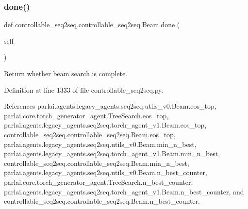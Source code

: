 \mbox{\label{classcontrollable__seq2seq_1_1controllable__seq2seq_1_1Beam_af40dafdaad342152b89d8c4f517c8d8b}} 
\subsubsection{\texorpdfstring{done()}{done()}}
{\footnotesize\ttfamily def controllable\+\_\+seq2seq.\+controllable\+\_\+seq2seq.\+Beam.\+done (\begin{DoxyParamCaption}\item[{}]{self }\end{DoxyParamCaption})}

\begin{DoxyVerb}Return whether beam search is complete.\end{DoxyVerb}
 

Definition at line 1333 of file controllable\+\_\+seq2seq.\+py.



References parlai.\+agents.\+legacy\+\_\+agents.\+seq2seq.\+utils\+\_\+v0.\+Beam.\+eos\+\_\+top, parlai.\+core.\+torch\+\_\+generator\+\_\+agent.\+Tree\+Search.\+eos\+\_\+top, parlai.\+agents.\+legacy\+\_\+agents.\+seq2seq.\+torch\+\_\+agent\+\_\+v1.\+Beam.\+eos\+\_\+top, controllable\+\_\+seq2seq.\+controllable\+\_\+seq2seq.\+Beam.\+eos\+\_\+top, parlai.\+agents.\+legacy\+\_\+agents.\+seq2seq.\+utils\+\_\+v0.\+Beam.\+min\+\_\+n\+\_\+best, parlai.\+agents.\+legacy\+\_\+agents.\+seq2seq.\+torch\+\_\+agent\+\_\+v1.\+Beam.\+min\+\_\+n\+\_\+best, controllable\+\_\+seq2seq.\+controllable\+\_\+seq2seq.\+Beam.\+min\+\_\+n\+\_\+best, parlai.\+agents.\+legacy\+\_\+agents.\+seq2seq.\+utils\+\_\+v0.\+Beam.\+n\+\_\+best\+\_\+counter, parlai.\+core.\+torch\+\_\+generator\+\_\+agent.\+Tree\+Search.\+n\+\_\+best\+\_\+counter, parlai.\+agents.\+legacy\+\_\+agents.\+seq2seq.\+torch\+\_\+agent\+\_\+v1.\+Beam.\+n\+\_\+best\+\_\+counter, and controllable\+\_\+seq2seq.\+controllable\+\_\+seq2seq.\+Beam.\+n\+\_\+best\+\_\+counter.

\mbox{\label{classcontrollable__seq2seq_1_1controllable__seq2seq_1_1Beam_a9c213fba3652f8490b9f80be89c9d7fc}} 
